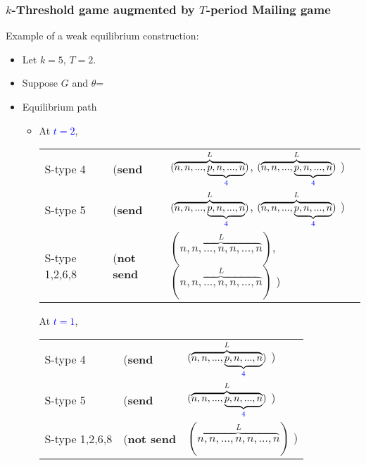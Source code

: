 \documentclass[9pt]{beamer}
\begin{document}
\begin{frame}
  \frametitle{$k$-Threshold game augmented by $T$-period Mailing game}
Example of a weak equilibrium construction:
\begin{itemize}
\item Let $k=5$, $T=2$.
\item Suppose $G$ and $\theta$=
\begin{center}
\end{center}
\end{itemize}

\begin{itemize}
\item Equilibrium path
\begin{itemize}
\item {}
{At \textcolor{blue}{$t=2$}, 
\begin{table}[h]
\begin{tabular}{ll l}
S-type 4 & (\textbf{send} & $(\overbrace{n,n,...,\underbrace{p,n,...,n}_{\textcolor{blue}{4}}}^{L})$, $(\overbrace{n,n,...,\underbrace{p,n,...,n}_{\textcolor{blue}{4}}}^{L})$ )\\
S-type 5 & (\textbf{send} & $(\overbrace{n,n,...,\underbrace{p,n,...,n}_{\textcolor{blue}{4}}}^{L})$, $(\overbrace{n,n,...,\underbrace{p,n,...,n}_{\textcolor{blue}{4}}}^{L})$ )\\
S-type 1,2,6,8 & (\textbf{not send} & $(\overbrace{n,n,...,n,n,...,n}^{L})$, $(\overbrace{n,n,...,n,n,...,n}^{L})$ )
\end{tabular}
\end{table}
}
{At \textcolor{blue}{$t=1$}, 
\begin{table}[h]
\begin{tabular}{ll l}
S-type 4 & (\textbf{send} & $(\overbrace{n,n,...,\underbrace{p,n,...,n}_{\textcolor{blue}{4}}}^{L})$ )\\
S-type 5 & (\textbf{send} & $(\overbrace{n,n,...,\underbrace{p,n,...,n}_{\textcolor{blue}{4}}}^{L})$ )\\
S-type 1,2,6,8 & (\textbf{not send} & $(\overbrace{n,n,...,n,n,...,n}^{L})$ )
\end{tabular}
\end{table}}


\end{itemize}

\end{itemize}



\end{frame}
\end{document}
